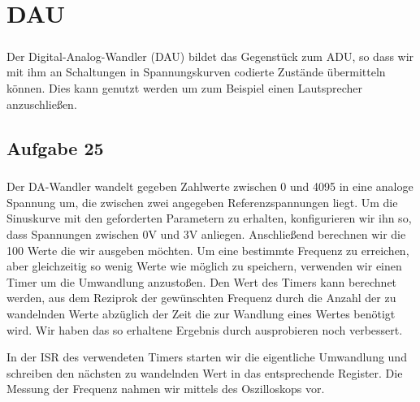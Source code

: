 \chapter{DAU}

\paragraph*{}
Der Digital-Analog-Wandler (DAU) bildet das Gegenstück zum ADU, so dass wir mit ihm an Schaltungen in Spannungskurven codierte Zustände übermitteln können. Dies kann genutzt werden um zum Beispiel einen Lautsprecher anzuschließen.

\section*{Aufgabe 25}

\paragraph*{}
Der DA-Wandler wandelt gegeben Zahlwerte zwischen 0 und 4095 in eine analoge Spannung um, die zwischen zwei angegeben Referenzspannungen liegt. Um die Sinuskurve mit den geforderten Parametern zu erhalten, konfigurieren wir ihn so, dass Spannungen zwischen 0V und 3V anliegen. Anschließend berechnen wir die 100 Werte die wir ausgeben möchten. Um eine bestimmte Frequenz zu erreichen, aber gleichzeitig so wenig Werte wie möglich zu speichern, verwenden wir einen Timer um die Umwandlung anzustoßen. Den Wert des Timers kann berechnet werden, aus dem Reziprok der gewünschten Frequenz durch die Anzahl der zu wandelnden Werte abzüglich der Zeit die zur Wandlung eines Wertes benötigt wird. Wir haben das so erhaltene Ergebnis durch ausprobieren noch verbessert.



In der ISR des verwendeten Timers starten wir die eigentliche Umwandlung und schreiben den nächsten zu wandelnden Wert in das entsprechende Register. Die Messung der Frequenz nahmen wir mittels des Oszilloskops vor.


